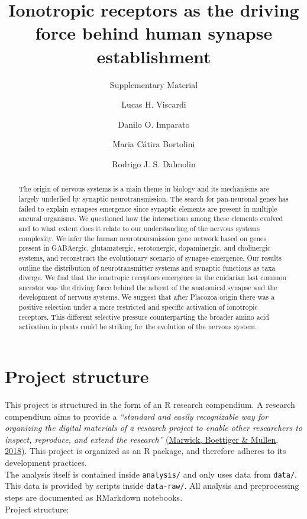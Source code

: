 \documentclass[
]{article}
\title{Ionotropic receptors as the driving force behind human synapse
establishment}
\subtitle{Supplementary Material}
\author{Lucas H. Viscardi \and Danilo O. Imparato \and Maria Cátira Bortolini \and Rodrigo J. S. Dalmolin}
\date{}
\begin{document}
\maketitle
\begin{abstract}
The origin of nervous systems is a main theme in biology and its
mechanisms are largely underlied by synaptic neurotransmission. The
search for pan-neuronal genes has failed to explain synapses emergence
since synaptic elements are present in multiple aneural organisms. We
questioned how the interactions among these elements evolved and to what
extent does it relate to our understanding of the nervous systems
complexity. We infer the human neurotransmission gene network based on
genes present in GABAergic, glutamatergic, serotonergic, dopaminergic,
and cholinergic systems, and reconstruct the evolutionary scenario of
synapse emergence. Our results outline the distribution of
neurotransmitter systems and synaptic functions as taxa diverge. We find
that the ionotropic receptors emergence in the cnidarian last common
ancestor was the driving force behind the advent of the anatomical
synapse and the development of nervous systems. We suggest that after
Placozoa origin there was a positive selection under a more restricted
and specific activation of ionotropic receptors. This different
selective pressure counterparting the broader amino acid activation in
plants could be striking for the evolution of the nervous system.
\end{abstract}

{
\setcounter{tocdepth}{3}
\tableofcontents
}
\hypertarget{project-structure}{%
\section{Project structure}\label{project-structure}}

This project is structured in the form of an R research compendium. A
research compendium aims to provide a \emph{``standard and easily
recognizable way for organizing the digital materials of a research
project to enable other researchers to inspect, reproduce, and extend
the research''}
\href{https://doi.org/10.1080/00031305.2017.1375986}{(Marwick, Boettiger
\& Mullen, 2018)}. This project is organized as an R package, and
therefore adheres to its development practices.\\
The analysis itself is contained inside \texttt{analysis/} and only uses
data from \texttt{data/}. This data is provided by scripts inside
\texttt{data-raw/}. All analysis and preprocessing steps are documented
as RMarkdown notebooks.\\
Project structure:
\end{document}
